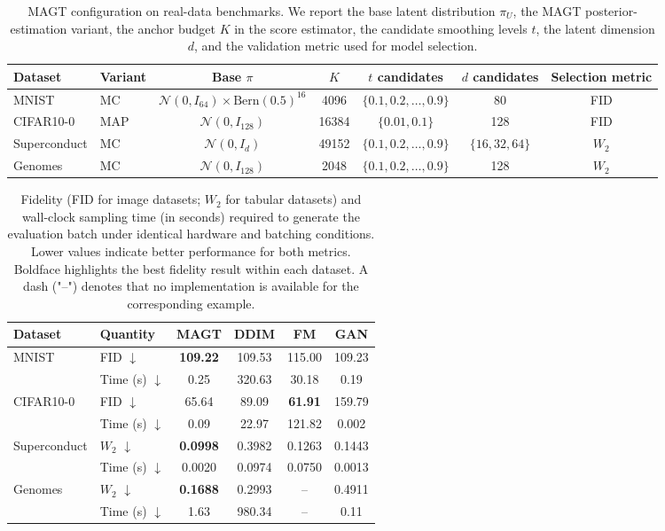 \documentclass[12pt]{article}
\theoremstyle{definition} %
\providecommand{\method}{MAGT} %
\newcommand{\cN}{\mathcal{N}}
\begin{document}
\begin{table}[t]
\centering
\caption{\method{} configuration on real-data benchmarks. We report the base latent distribution $\pi_U$, the \method{} posterior-estimation variant, the anchor budget $K$ in the score estimator, the candidate smoothing levels $t$, the latent dimension $d$, and the validation metric used for model selection.}
\label{tab:real-config}
\scriptsize
\setlength{\tabcolsep}{4.5pt}
\renewcommand{\arraystretch}{0.95}
\begin{tabular}{l l c c c c c}
\toprule
Dataset & Variant & Base $\pi$ & $K$ & $t$ candidates & $d$ candidates & Selection metric \\
\midrule
MNIST 
& MC 
& $\cN(0,I_{64})\times \mathrm{Bern}(0.5)^{16}$ 
& 4096 
& $\{0.1,0.2,\ldots,0.9\}$ 
& 80 
& FID \\
CIFAR10-0 
& MAP 
& $\cN(0,I_{128})$ 
& 16384 
& $\{0.01,0.1\}$ 
& 128 
& FID \\
Superconduct 
& MC 
& $\cN(0,I_d)$ 
& 49152 
& $\{0.1,0.2,\ldots,0.9\}$ 
& $\{16,32,64\}$ 
& $W_2$ \\
Genomes 
& MC 
& $\cN(0,I_{128})$ 
& 2048 
& $\{0.1,0.2,\ldots,0.9\}$ 
& 128 
& $W_2$ \\
\bottomrule
\end{tabular}
\end{table}



\begin{table}[htbp]
\centering
\caption{
Fidelity (FID for image datasets; $W_2$ for tabular datasets) and wall-clock sampling time (in seconds) required to generate the evaluation batch under identical hardware and batching conditions. Lower values indicate better performance for both metrics. Boldface highlights the best fidelity result within each dataset. A dash ("--") denotes that no implementation is available for the corresponding example.}
\label{tab:mnist_cifar10}
\small
\setlength{\tabcolsep}{5pt}
\renewcommand{\arraystretch}{0.95}
\begin{tabular}{l l c c c c}
\toprule
Dataset & Quantity & \method{} & DDIM & FM & GAN \\
\midrule
\multirow{2}{*}{MNIST} 
& FID $\downarrow$ 
& \textbf{109.22} & 109.53 & 115.00 & 109.23\\
& Time (s) $\downarrow$ 
& 0.25 & 320.63 & 30.18 & 0.19\\
\midrule
\multirow{2}{*}{CIFAR10-0} 
& FID $\downarrow$ 
& 65.64 & 89.09 & \textbf{61.91} & 159.79\\
& Time (s) $\downarrow$ 
& 0.09 & 22.97 & 121.82 & 0.002\\
\midrule
\multirow{2}{*}{Superconduct} 
& $W_2$ $\downarrow$ 
& \textbf{0.0998} & 0.3982 & 0.1263 & 0.1443\\
& Time (s) $\downarrow$ 
& 0.0020 & 0.0974 & 0.0750 & 0.0013\\
\midrule
\multirow{2}{*}{Genomes} 
& $W_2$ $\downarrow$ 
& \textbf{0.1688} & 0.2993 & -- & 0.4911\\
& Time (s) $\downarrow$ 
& 1.63 & 980.34 & -- & 0.11\\
\bottomrule
\end{tabular}
\end{table}
\end{document}
